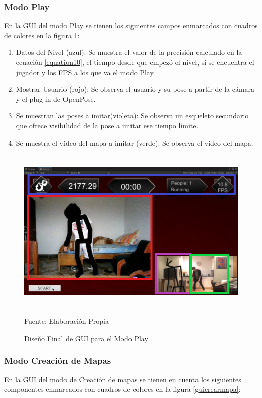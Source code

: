 \subsubsection{Modo Play}

En la GUI del modo Play se tienen los siguientes campos enmarcados con cuadros de colores en la figura \ref{guiplay2}:
\begin{enumerate}
	\item Datos del Nivel (azul): Se muestra el valor de la precisión calculado en la ecuación \ref{equation10}, el tiempo desde que empezó el nivel, si se encuentra el jugador y los FPS a los que va el modo Play.
	\item Mostrar Usuario (rojo): Se observa el usuario y su pose a partir de la cámara y el plug-in de OpenPose.
	\item Se muestran las poses a imitar(violeta): Se observa un esqueleto secundario que ofrece visibilidad de la pose a imitar ese tiempo límite.
	\item Se muestra el vídeo del mapa a imitar (verde): Se observa el vídeo del mapa.
\end{enumerate}

\begin{figure}[t!]
	\centering
	\includegraphics[width=14cm,height=8cm,]{./Images/poseitplay.png}
	\caption{Diseño Final de GUI para el Modo Play}
	\footnotesize Fuente: Elaboración Propia
	\label{guiplay2}
\end{figure}

\subsubsection{Modo Creación de Mapas}

En la GUI del modo de Creación de mapas se tienen en cuenta los siguientes componentes enmarcados con cuadros de colores en la figura \ref{guicrearmapa}:

